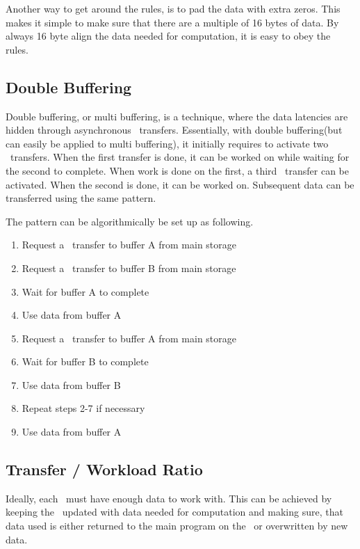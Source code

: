 Another way to get around the rules, is to pad the data with extra
zeros. This makes it simple to make sure that there are a multiple of
16 bytes of data. By always 16 byte align the data needed for
computation, it is easy to obey the rules.

\subsection{Double Buffering}
\label{sec:doublebuffering}

Double buffering, or multi buffering, is a technique, where the data
latencies are hidden through asynchronous
\DMA\ transfers. Essentially, with double buffering(but can easily be
applied to multi buffering), it initially requires to activate two
\DMA\ transfers. When the first transfer is done, it can be worked on
while waiting for the second to complete. When work is done on the
first, a third \DMA\ transfer can be activated. When the second is
done, it can be worked on. Subsequent data can be transferred using the
same pattern.

The pattern can be algorithmically be set up as following.

\begin{enumerate}
\item{Request a \DMA\ transfer to buffer A from main storage}
\item{Request a \DMA\ transfer to buffer B from main storage}
\item{Wait for buffer A to complete}
\item{Use data from buffer A}
\item{Request a \DMA\ transfer to buffer A from main storage}
\item{Wait for buffer B to complete}
\item{Use data from buffer B}
\item{Repeat steps 2-7 if necessary}
\item{Use data from buffer A}
\end{enumerate}

\subsection{Transfer / Workload Ratio}
\label{sec:transferworkload}

Ideally, each \SPE\ must have enough data to work with. This can be
achieved by keeping the \LS\ updated with data needed for computation
and making sure, that data used is either returned to the main program
on the \PPE\ or overwritten by new data.

